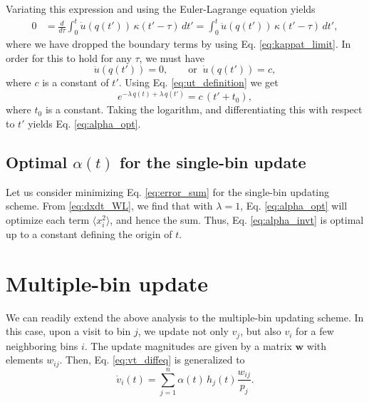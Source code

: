\documentclass[reprint]{revtex4-1}
\begin{document}
Variating this expression and
using the Euler-Lagrange equation yields
$$
\begin{aligned}
0
&=
\frac{d}{d\tau} \int_0^t \dot u(q(t')) \, \kappa(t' - \tau) \, dt'
= \int_0^t \ddot u(q(t')) \, \kappa(t' - \tau) \, dt',
\end{aligned}
$$
where we have dropped the boundary terms
by using Eq. \eqref{eq:kappat_limit}.
%
%
In order for this to hold for any $\tau$,
we must have
%
\begin{equation}
\ddot u(q(t')) = 0,
\qquad
\mathrm{or}
\;\;
\dot u(q(t')) = c,
\label{eq:ddu_eq_0}
\end{equation}
%
where $c$ is a constant of $t'$.
%
Using Eq. \eqref{eq:ut_definition}
we get
$$
e^{-\lambda \, q(t) + \lambda \, q(t')}
=
c \, (t' + t_0),
$$
where $t_0$ is a constant.
%
Taking the logarithm, and differentiating this with respect to $t'$
yields Eq. \eqref{eq:alpha_opt}.



\subsection{Optimal $\alpha(t)$ for the single-bin update}



Let us consider minimizing Eq. \eqref{eq:error_sum}
for the single-bin updating scheme.
%
From \eqref{eq:dxdt_WL}, we find that
with $\lambda = 1$,
Eq. \eqref{eq:alpha_opt}
will optimize each term $\langle x_i^2 \rangle$,
and hence the sum.
%
Thus, Eq. \eqref{eq:alpha_invt} is optimal
up to a constant defining the origin of $t$.



\section{\label{sec:multiple-bin}
Multiple-bin update}



We can readily extend the above analysis to
the multiple-bin updating scheme.
%
In this case,
upon a visit to bin $j$,
we update not only $v_j$,
but also $v_i$ for a few neighboring bins $i$.
%
The update magnitudes are given by a matrix $\mathbf w$
with elements $w_{ij}$.
%
Then, Eq. \eqref{eq:vt_diffeq} is generalized to
\begin{equation}
  \dot v_i(t) =
  \sum_{j=1}^n \alpha(t) \, h_j(t) \frac{ w_{ij} } { p_j }.
  \label{eq:vt_diffeq_mbin}
\end{equation}
\end{document}
